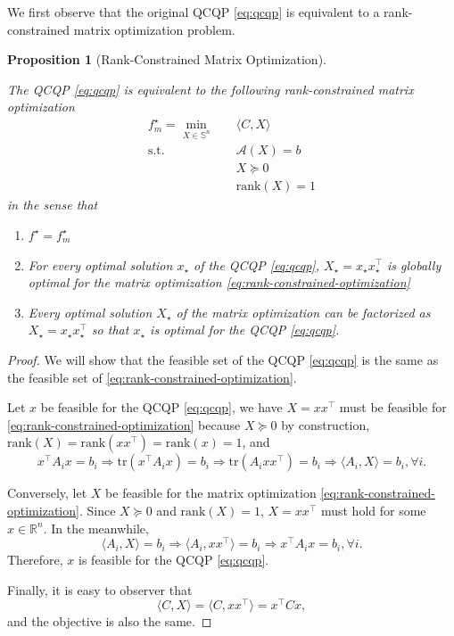 \documentclass[
]{book}
\newtheorem{proposition}{Proposition}[chapter]
\theoremstyle{definition}
\theoremstyle{definition}
\theoremstyle{definition}
\theoremstyle{definition}
\theoremstyle{remark}
\begin{document}
We first observe that the original QCQP \eqref{eq:qcqp} is equivalent to a rank-constrained matrix optimization problem.

\begin{proposition}[Rank-Constrained Matrix Optimization]
\protect\hypertarget{prp:RankConstrainedMatrix}{}\label{prp:RankConstrainedMatrix}

The QCQP \eqref{eq:qcqp} is equivalent to the following rank-constrained matrix optimization
\begin{equation}
\begin{split}
f^\star_m = \min_{X \in \mathbb{S}^{n}} & \quad \langle C, X \rangle \\
\mathrm{s.t.}& \quad \mathcal{A}(X) = b \\
& \quad X \succeq 0 \\
& \quad \mathrm{rank}(X) = 1
\end{split}
\label{eq:rank-constrained-optimization}
\end{equation}
in the sense that

\begin{enumerate}
\def\labelenumi{\arabic{enumi}.}
\item
  \(f^\star = f^\star_m\)
\item
  For every optimal solution \(x_\star\) of the QCQP \eqref{eq:qcqp}, \(X_\star = x_\star x_\star^\top\) is globally optimal for the matrix optimization \eqref{eq:rank-constrained-optimization}
\item
  Every optimal solution \(X_\star\) of the matrix optimization can be factorized as \(X_\star = x_\star x_\star^\top\) so that \(x_\star\) is optimal for the QCQP \eqref{eq:qcqp}.
\end{enumerate}

\end{proposition}

\begin{proof}
We will show that the feasible set of the QCQP \eqref{eq:qcqp} is the same as the feasible set of \eqref{eq:rank-constrained-optimization}.

Let \(x\) be feasible for the QCQP \eqref{eq:qcqp}, we have \(X=xx^\top\) must be feasible for \eqref{eq:rank-constrained-optimization} because \(X \succeq 0\) by construction, \(\mathrm{rank}(X) = \mathrm{rank}(xx^\top) = \mathrm{rank}(x) = 1\), and
\[
x^\top A_i x = b_i \Rightarrow \mathrm{tr}(x^\top A_i x) = b_i \Rightarrow \mathrm{tr}(A_i x x^\top) = b_i \Rightarrow \langle A_i, X \rangle = b_i, \forall i.
\]

Conversely, let \(X\) be feasible for the matrix optimization \eqref{eq:rank-constrained-optimization}. Since \(X \succeq 0\) and \(\mathrm{rank}(X) = 1\), \(X = xx^\top\) must hold for some \(x \in \mathbb{R}^{n}\). In the meanwhile,
\[
\langle A_i, X \rangle = b_i \Rightarrow \langle A_i, xx^\top \rangle = b_i \Rightarrow x^\top A_i x = b_i, \forall i.
\]
Therefore, \(x\) is feasible for the QCQP \eqref{eq:qcqp}.

Finally, it is easy to observer that
\[
\langle C, X \rangle = \langle C, xx^\top \rangle = x^\top C x,
\]
and the objective is also the same.
\end{proof}
\end{document}
